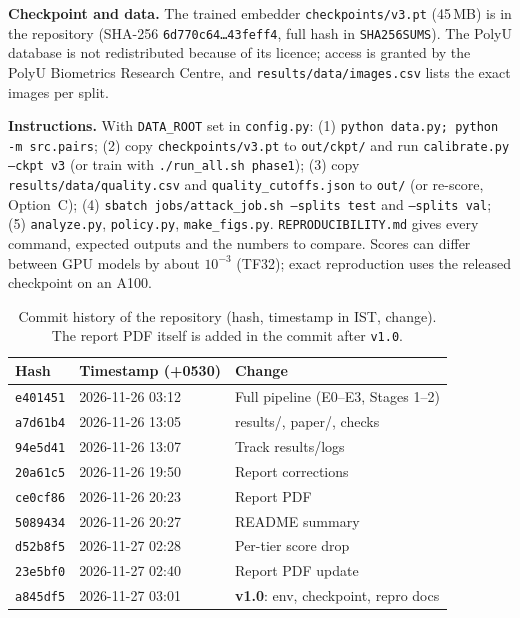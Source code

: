 \documentclass[10pt,twocolumn,letterpaper]{article}
\begin{document}
\textbf{Checkpoint and data.} The trained embedder \texttt{checkpoints/v3.pt} (45\,MB) is in the repository (SHA-256 \texttt{6d770c64\ldots 43feff4}, full hash in \texttt{SHA256SUMS}). The PolyU database is not redistributed because of its licence; access is granted by the PolyU Biometrics Research Centre, and \texttt{results/data/images.csv} lists the exact images per split.

\textbf{Instructions.} With \texttt{DATA\_ROOT} set in \texttt{config.py}: (1) \texttt{python data.py; python -m src.pairs}; (2) copy \texttt{checkpoints/v3.pt} to \texttt{out/ckpt/} and run \texttt{calibrate.py --ckpt v3} (or train with \texttt{./run\_all.sh phase1}); (3) copy \texttt{results/data/quality.csv} and \texttt{quality\_cutoffs.json} to \texttt{out/} (or re-score, Option~C); (4) \texttt{sbatch jobs/attack\_job.sh --splits test} and \texttt{--splits val}; (5) \texttt{analyze.py}, \texttt{policy.py}, \texttt{make\_figs.py}. \texttt{REPRODUCIBILITY.md} gives every command, expected outputs and the numbers to compare. Scores can differ between GPU models by about $10^{-3}$ (TF32); exact reproduction uses the released checkpoint on an A100.

\begin{table}[t]
\centering\footnotesize\setlength{\tabcolsep}{3pt}
\caption{Commit history of the repository (hash, timestamp in IST, change). The report PDF itself is added in the commit after \texttt{v1.0}.}
\label{tab:commits}
\begin{tabular}{lll}
\toprule
Hash & Timestamp (+0530) & Change \\
\midrule
\texttt{e401451} & 2026-11-26 03:12 & Full pipeline (E0--E3, Stages 1--2) \\
\texttt{a7d61b4} & 2026-11-26 13:05 & results/, paper/, checks \\
\texttt{94e5d41} & 2026-11-26 13:07 & Track results/logs \\
\texttt{20a61c5} & 2026-11-26 19:50 & Report corrections \\
\texttt{ce0cf86} & 2026-11-26 20:23 & Report PDF \\
\texttt{5089434} & 2026-11-26 20:27 & README summary \\
\texttt{d52b8f5} & 2026-11-27 02:28 & Per-tier score drop \\
\texttt{23e5bf0} & 2026-11-27 02:40 & Report PDF update \\
\texttt{a845df5} & 2026-11-27 03:01 & \textbf{v1.0}: env, checkpoint, repro docs \\
\bottomrule
\end{tabular}
\end{table}
\end{document}
